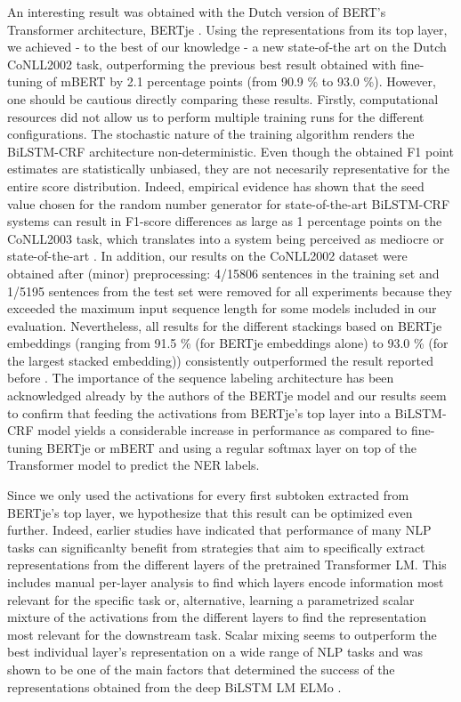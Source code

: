 \documentclass[12pt,a4paper,]{book}
\begin{document}
An interesting result was obtained with the Dutch version of BERT's Transformer architecture, BERTje \citep{devries2019}. Using the representations from its top layer, we achieved - to the best of our knowledge - a new state-of-the art on the Dutch CoNLL2002 task, outperforming the previous best result obtained with fine-tuning of mBERT \citep{wu2019} by 2.1 percentage points (from 90.9 \% to 93.0 \%). However, one should be cautious directly comparing these results. Firstly, computational resources did not allow us to perform multiple training runs for the different configurations. The stochastic nature of the training algorithm renders the BiLSTM-CRF architecture non-deterministic. Even though the obtained F1 point estimates are statistically unbiased, they are not necesarily representative for the entire score distribution. Indeed, empirical evidence has shown that the seed value chosen for the random number generator for state-of-the-art BiLSTM-CRF systems can result in F1-score differences as large as 1 percentage points on the CoNLL2003 task, which translates into a system being perceived as mediocre or state-of-the-art \citep{reimers2017}. In addition, our results on the CoNLL2002 dataset were obtained after (minor) preprocessing: 4/15806 sentences in the training set and 1/5195 sentences from the test set were removed for all experiments because they exceeded the maximum input sequence length for some models included in our evaluation. Nevertheless, all results for the different stackings based on BERTje embeddings (ranging from 91.5 \% (for BERTje embeddings alone) to 93.0 \% (for the largest stacked embedding)) consistently outperformed the result reported before \citep{devries2019, wu2019}. The importance of the sequence labeling architecture has been acknowledged already by the authors of the BERTje model \citep{devries2019} and our results seem to confirm that feeding the activations from BERTje's top layer into a BiLSTM-CRF model yields a considerable increase in performance as compared to fine-tuning BERTje or mBERT and using a regular softmax layer on top of the Transformer model to predict the NER labels.

Since we only used the activations for every first subtoken extracted from BERTje's top layer, we hypothesize that this result can be optimized even further. Indeed, earlier studies have indicated that performance of many NLP tasks can significanlty benefit from strategies that aim to specifically extract representations from the different layers of the pretrained Transformer LM. This includes manual per-layer analysis to find which layers encode information most relevant for the specific task or, alternative, learning a parametrized scalar mixture of the activations from the different layers to find the representation most relevant for the downstream task. Scalar mixing seems to outperform the best individual layer's representation on a wide range of NLP tasks \citep{liu2019} and was shown to be one of the main factors that determined the success of the representations obtained from the deep BiLSTM LM ELMo \citep{peters2018}.
\end{document}
